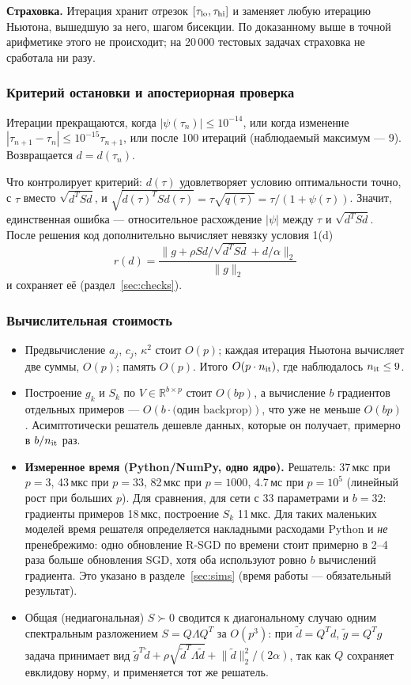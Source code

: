 \documentclass[11pt,a4paper]{article}
\newcommand{\norm}[1]{\lVert #1\rVert_2}
\begin{document}
\textbf{Страховка.} Итерация хранит отрезок $[\tau_{\rm lo},\tau_{\rm hi}]$ и заменяет
любую итерацию Ньютона, вышедшую за него, шагом бисекции. По доказанному выше в точной
арифметике этого не происходит; на 20\,000 тестовых задачах страховка не сработала ни
разу.

\subsubsection*{Критерий остановки и апостериорная проверка}

Итерации прекращаются, когда $|\psi(\tau_n)|\le10^{-14}$, или когда изменение
$|\tau_{n+1}-\tau_n|\le10^{-15}\tau_{n+1}$, или после 100 итераций (наблюдаемый
максимум — 9). Возвращается $d=d(\tau_n)$.

Что контролирует критерий: $d(\tau)$ удовлетворяет условию оптимальности точно, с
$\tau$ вместо $\sqrt{d^TSd}$, и
$\sqrt{d(\tau)^TSd(\tau)}=\tau\sqrt{q(\tau)}=\tau/(1+\psi(\tau))$. Значит, единственная
ошибка — относительное расхождение $|\psi|$ между $\tau$ и $\sqrt{d^TSd}$. После решения
код дополнительно вычисляет невязку условия 1(d)
\begin{equation*}
r(d)=\frac{\norm{g+\rho Sd/\sqrt{d^TSd}+d/\alpha}}{\norm g}
\end{equation*}
и сохраняет её (раздел~\ref{sec:checks}).

\subsubsection*{Вычислительная стоимость}

\begin{itemize}
\item Предвычисление $a_j$, $c_j$, $\kappa^2$ стоит $O(p)$; каждая итерация Ньютона
вычисляет две суммы, $O(p)$; память $O(p)$. Итого $O(p\cdot n_{\rm it})$, где
наблюдалось $n_{\rm it}\le9$.
\item Построение $g_k$ и $S_k$ по $V\in\mathbb R^{b\times p}$ стоит $O(bp)$, а
вычисление $b$ градиентов отдельных примеров — $O(b\cdot\text{(один backprop)})$, что
уже не меньше $O(bp)$. Асимптотически решатель дешевле данных, которые он получает,
примерно в $b/n_{\rm it}$ раз.
\item \textbf{Измеренное время (Python/NumPy, одно ядро).} Решатель: 37\,мкс при
$p=3$, 43\,мкс при $p=33$, 82\,мкс при $p=1000$, 4.7\,мс при $p=10^5$ (линейный рост
при больших $p$). Для сравнения, для сети с 33 параметрами и $b=32$: градиенты примеров
18\,мкс, построение $S_k$ 11\,мкс. Для таких маленьких моделей время решателя
определяется накладными расходами Python и \emph{не} пренебрежимо: одно обновление
R-SGD по времени стоит примерно в 2--4 раза больше обновления SGD, хотя оба используют
ровно $b$ вычислений градиента. Это указано в разделе~\ref{sec:sims} (время работы — обязательный
результат).
\item Общая (недиагональная) $S\succ0$ сводится к диагональному случаю одним
спектральным разложением $S=Q\Lambda Q^T$ за $O(p^3)$: при $\tilde d=Q^Td$,
$\tilde g=Q^Tg$ задача принимает вид
$\tilde g^T\tilde d+\rho\sqrt{\tilde d^T\Lambda\tilde d}+\norm{\tilde d}^2/(2\alpha)$,
так как $Q$ сохраняет евклидову норму, и применяется тот же решатель.
\end{itemize}
\end{document}
